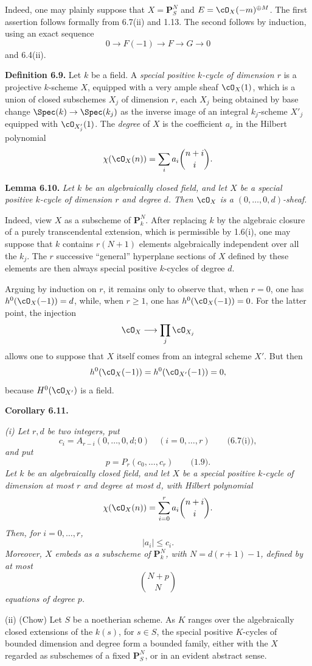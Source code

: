 Indeed, one may plainly suppose that $X=\mathbf P^N_S$ and $E=\cO_X(-m)^{\oplus M}$. The first assertion follows formally from 6.7(ii) and 1.13. The second follows by induction, using an exact sequence
\[
  0\longrightarrow F(-1)\longrightarrow F\longrightarrow G\longrightarrow0
\]
and 6.4(ii).

\textbf{Definition 6.9.} Let $k$ be a field. A \emph{special positive $k$-cycle of dimension $r$} is a projective $k$-scheme $X$, equipped with a very ample sheaf $\cO_X(1)$, which is a union of closed subschemes $X_j$ of dimension $r$, each $X_j$ being obtained by base change $\Spec(k)\to\Spec(k_j)$ as the inverse image of an integral $k_j$-scheme $X'_j$ equipped with $\cO_{X'_j}(1)$. The \emph{degree} of $X$ is the coefficient $a_r$ in the Hilbert polynomial
\[
  \chi(\cO_X(n))=\sum_i a_i\binom{n+i}{i}.
\]

\textbf{Lemma 6.10.} \emph{Let $k$ be an algebraically closed field, and let $X$ be a special positive $k$-cycle of dimension $r$ and degree $d$. Then $\cO_X$ is a $(0,\ldots,0,d)$-sheaf.}

Indeed, view $X$ as a subscheme of $\mathbf P^N_k$. After replacing $k$ by the algebraic closure of a purely transcendental extension, which is permissible by 1.6(i), one may suppose that $k$ contains $r(N+1)$ elements algebraically independent over all the $k_j$. The $r$ successive ``general'' hyperplane sections of $X$ defined by these elements are then always special positive $k$-cycles of degree $d$.

Arguing by induction on $r$, it remains only to observe that, when $r=0$, one has $h^0(\cO_X(-1))=d$, while, when $r\geq1$, one has $h^0(\cO_X(-1))=0$. For the latter point, the injection
\[
  \cO_X\longrightarrow\prod_j\cO_{X_j}
\]
allows one to suppose that $X$ itself comes from an integral scheme $X'$. But then
\[
  h^0(\cO_X(-1))=h^0(\cO_{X'}(-1))=0,
\]
because $H^0(\cO_{X'})$ is a field.

\textbf{Corollary 6.11.} {\itshape (i) Let $r,d$ be two integers, put
\[
  c_i=A_{r-i}(0,\ldots,0,d;0)\quad(i=0,\ldots,r)
  \qquad\text{(6.7(i))},
\]
and put
\[
  p=P_r(c_0,\ldots,c_r)\qquad\text{(1.9)}.
\]
Let $k$ be an algebraically closed field, and let $X$ be a special positive $k$-cycle of dimension at most $r$ and degree at most $d$, with Hilbert polynomial
\[
  \chi(\cO_X(n))=\sum_{i=0}^{r}a_i\binom{n+i}{i}.
\]
Then, for $i=0,\ldots,r$,
\[
  |a_i|\leq c_i.
\]
Moreover, $X$ embeds as a subscheme of $\mathbf P^N_k$, with $N=d(r+1)-1$, defined by at most
\[
  \binom{N+p}{N}
\]
equations of degree $p$.

(ii) (Chow) Let $S$ be a noetherian scheme. As $K$ ranges over the algebraically closed extensions of the $k(s)$, for $s\in S$, the special positive $K$-cycles of bounded dimension and degree form a bounded family, either with the $X$ regarded as subschemes of a fixed $\mathbf P^N_S$, or in an evident abstract sense.\par}

